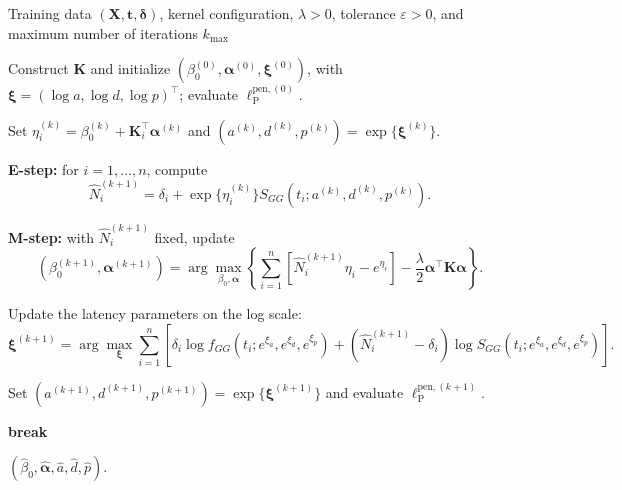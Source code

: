 \begin{algorithm*}[tbp]
	\caption{Penalized EM algorithm for the Poisson GG-KM model}
	\label{alg:poisson-em}
	\begin{algorithmic}[1]

		\Require Training data $(\bm X,\bm t,\bm\delta)$, kernel configuration,
		$\lambda>0$, tolerance $\varepsilon>0$, and maximum number of
		iterations $k_{\max}$

		\State Construct $\bm K$ and initialize
		$(\beta_0^{(0)},\bm\alpha^{(0)},\bm\xi^{(0)})$, with
		$\bm\xi=(\log a,\log d,\log p)^\top$; evaluate
		$\ell_{\mathrm P}^{\mathrm{pen},(0)}$.


			\State Set
			$\eta_i^{(k)}
			=\beta_0^{(k)}+\bm K_i^\top\bm\alpha^{(k)}$ and
			$(a^{(k)},d^{(k)},p^{(k)})=\exp\{\bm\xi^{(k)}\}$.

			\State \textbf{E-step:} for $i=1,\ldots,n$, compute
			\[
			\widehat N_i^{(k+1)}
			=
			\delta_i+
			\exp\{\eta_i^{(k)}\}
			S_{GG}\!\left(
				t_i;a^{(k)},d^{(k)},p^{(k)}
			\right).
			\]

			\State \textbf{M-step:} with $\widehat N_i^{(k+1)}$ fixed, update
			\[
			(\beta_0^{(k+1)},\bm\alpha^{(k+1)})
			=
			\arg\max_{\beta_0,\bm\alpha}
			\left\{
			\sum_{i=1}^{n}
			\left[
				\widehat N_i^{(k+1)}\eta_i-e^{\eta_i}
			\right]
			-
			\frac{\lambda}{2}
			\bm\alpha^\top\bm K\bm\alpha
			\right\}.
			\]

			\State Update the latency parameters on the log scale:
			\[
			\bm\xi^{(k+1)}
			=
			\arg\max_{\bm\xi}
			\sum_{i=1}^{n}
			\left[
				\delta_i
				\log f_{GG}\!\left(t_i;e^{\xi_a},e^{\xi_d},e^{\xi_p}\right)
				+
				(\widehat N_i^{(k+1)}-\delta_i)
				\log S_{GG}\!\left(t_i;e^{\xi_a},e^{\xi_d},e^{\xi_p}\right)
			\right].
			\]

			\State Set
			$(a^{(k+1)},d^{(k+1)},p^{(k+1)})
			=\exp\{\bm\xi^{(k+1)}\}$ and evaluate
			$\ell_{\mathrm P}^{\mathrm{pen},(k+1)}$.

				\State \textbf{break}
			\EndIf

		\EndFor

		\State \Return
		$(\widehat\beta_0,\widehat{\bm\alpha},
		\widehat a,\widehat d,\widehat p)$.

	\end{algorithmic}
\end{algorithm*}

